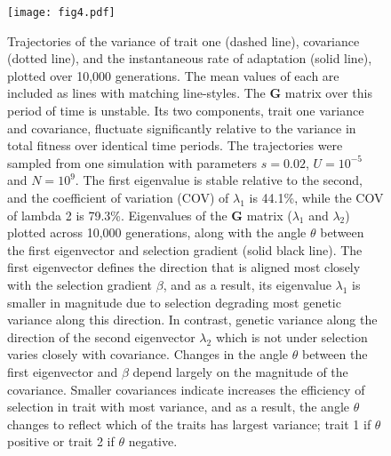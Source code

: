 \documentclass[9pt,twocolumn,twoside]{gsajnl}
\newcommand{\G}{\textbf{G }}
\begin{document}
\begin{figure}[!ht]
\texttt{[image: fig4.pdf]}
% 
% 
\caption{Trajectories of the variance of trait one (dashed line), covariance (dotted line), and the instantaneous rate of adaptation (solid line), plotted over 10,000 generations. The mean values of each are included as lines with matching line-styles. The \G matrix over this period of time is unstable. Its two components, trait one variance and covariance, fluctuate significantly relative to the variance in total fitness over identical time periods. The trajectories were sampled from one simulation with parameters $s=0.02$, $U=10^{-5}$ and $N=10^9$. The first eigenvalue is stable relative to the second, and the coefficient of variation (COV) of $\lambda_1$ is 44.1\%, while the COV of lambda 2 is 79.3\%. Eigenvalues of the \G matrix ($\lambda_1$ and $\lambda_2$) plotted across 10,000 generations, along with the angle $\theta$ between the first eigenvector and selection gradient (solid black line). The first eigenvector defines the direction that is aligned most closely with the selection gradient $\beta$, and as a result, its eigenvalue $\lambda_1$ is smaller in magnitude due to selection degrading most genetic variance along this direction. In contrast, genetic variance along the direction of the second eigenvector $\lambda_2$ which is not under selection varies closely with covariance. Changes in the angle $\theta$ between the first eigenvector and $\beta$ depend largely on the magnitude of the covariance. Smaller covariances indicate increases the efficiency of selection in trait with most variance, and as a result, the angle $\theta$   changes to reflect which of the traits has largest variance; trait 1 if $\theta$ positive or trait 2 if $\theta$ negative. }\label{fig:4}
% 
% 
% 
%
\end{figure}
\end{document}
